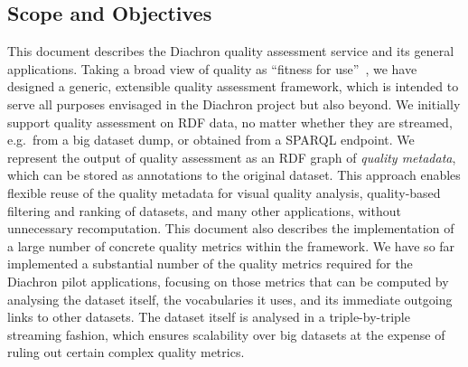 
\subsection{Scope and Objectives}
\label{sec:ScopeAndObjectives} 

This document describes the Diachron quality assessment service and its general applications.
Taking a broad view of quality as ``fitness for use''~\cite{Juran1974:biblatex}, we have designed a generic, extensible quality assessment framework, which is intended to serve all purposes envisaged in the Diachron project but also beyond.
We initially support quality assessment on RDF data, no matter whether they are streamed, e.g.\ from a big dataset dump, or obtained from a SPARQL endpoint.
We represent the output of quality assessment as an RDF graph of \emph{quality metadata}, which can be stored as annotations to the original dataset.
This approach enables flexible reuse of the quality metadata for visual quality analysis, quality-based filtering and ranking of datasets, and many other applications, without unnecessary recomputation.
This document also describes the implementation of a large number of concrete quality metrics within the framework.
We have so far implemented a substantial number of the quality metrics required for the Diachron pilot applications, focusing on those metrics that can be computed by analysing the dataset itself, the vocabularies it uses, and its immediate outgoing links to other datasets.
The dataset itself is analysed in a triple-by-triple streaming fashion, which ensures scalability over big datasets at the expense of ruling out certain complex quality metrics.
